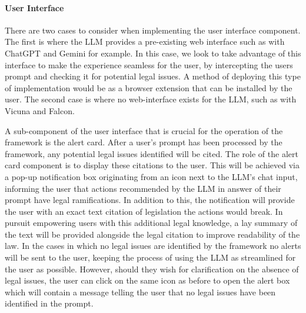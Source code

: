 \documentclass[sn-mathphys-num]{sn-jnl}%
\begin{document}
\paragraph{\textbf{User Interface}}
There are two cases to consider when implementing the user interface component. The first is where the LLM provides a pre-existing web interface such as with ChatGPT and Gemini for example. In this case, we look to take advantage of this interface to make the experience seamless for the user, by intercepting the users prompt and checking it for potential legal issues. A method of deploying this type of implementation would be as a browser extension that can be installed by the user. The second case is where no web-interface exists for the LLM, such as with Vicuna and Falcon.

A sub-component of the user interface that is crucial for the operation of the framework is the alert card. After a user's prompt has been processed by the framework, any potential legal issues identified will be cited. The role of the alert card component is to display these citations to the user. This will be achieved via a pop-up notification box originating from an icon next to the LLM's chat input, informing the user that actions recommended by the LLM in answer of their prompt have legal ramifications. In addition to this, the notification will provide the user with an exact text citation of legislation the actions would break. In pursuit empowering users with this additional legal knowledge, a lay summary of the text will be provided alongside the legal citation to improve readability of the law. In the cases in which no legal issues are identified by the framework no alerts will be sent to the user, keeping the process of using the LLM as streamlined for the user as possible. However, should they wish for clarification on the absence of legal issues, the user can click on the same icon as before to open the alert box which will contain a message telling the user that no legal issues have been identified in the prompt.
\end{document}
